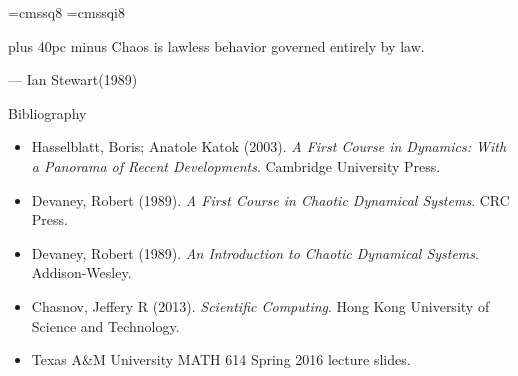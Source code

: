 \documentclass[aspectratio=169]{beamer}
\begin{document}
\font\eightss=cmssq8
\font\eightssi=cmssqi8
\newcommand\quoteAuthorDate[3]{\begingroup
  \baselineskip 10pt
  \parfillskip 0pt
  \interlinepenalty 10000 %
  \leftskip 0pt plus 40pc minus \parindent
  \let\rm=\eightss
  \let\sl=\eightssi
  \everypar{\sl}#1\par
  \nobreak\smallskip
  \noindent\rm--- #2\unskip\enspace(#3)\par
  \endgroup}
\begin{frame}
    \begin{center}
        \item \quoteAuthorDate{Chaos is lawless behavior governed entirely by law.}{Ian Stewart}{\textcolor{sigma@mainblue}{1989}}
    \end{center}
\end{frame}

\begin{frame}[allowframebreaks]{Bibliography}
    \tiny
    
    
    \begin{itemize}
        \item Hasselblatt, Boris; Anatole Katok (2003). \textit{A First Course in Dynamics: With a Panorama of Recent Developments}. Cambridge University Press.
        \item Devaney, Robert (1989). \textit{A First Course in Chaotic Dynamical Systems}. CRC Press.
        \item Devaney, Robert (1989). \textit{An Introduction to Chaotic Dynamical Systems}. Addison-Wesley.
        \item Chasnov, Jeffery R (2013). \textit{Scientific Computing}. Hong Kong University of Science and Technology.
        \item Texas A&M University MATH 614 Spring 2016 lecture slides. 
    \end{itemize}
\end{frame}
\end{document}
